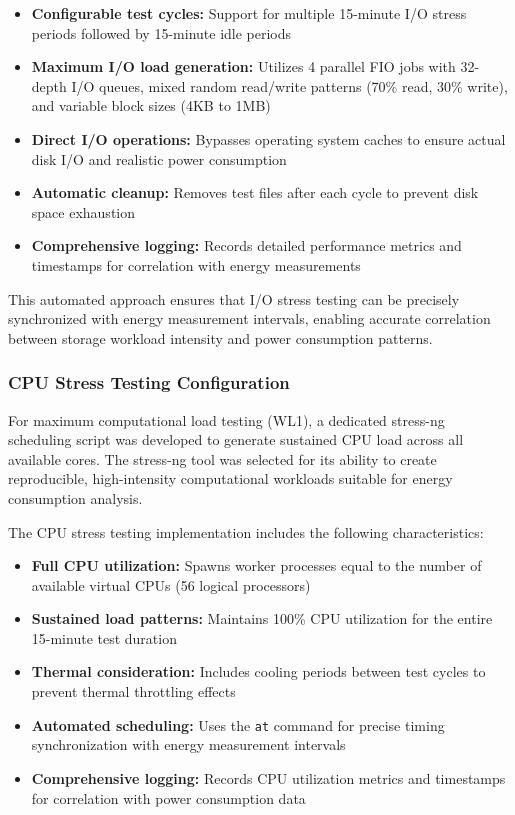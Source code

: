 \begin{itemize}
    \item \textbf{Configurable test cycles:} Support for multiple 15-minute I/O stress periods
    followed by 15-minute idle periods
    \item \textbf{Maximum I/O load generation:} Utilizes 4 parallel FIO jobs with 32-depth I/O queues,
    mixed random read/write patterns (70\% read, 30\% write), and variable block sizes (4KB to 1MB)
    \item \textbf{Direct I/O operations:} Bypasses operating system caches to ensure actual disk I/O
    and realistic power consumption
    \item \textbf{Automatic cleanup:} Removes test files after each cycle to prevent disk space
    exhaustion
    \item \textbf{Comprehensive logging:} Records detailed performance metrics and timestamps
    for correlation with energy measurements
\end{itemize}

This automated approach ensures that I/O stress testing can be precisely 
synchronized with energy measurement intervals, enabling accurate correlation 
between storage workload intensity and power consumption patterns.

\subsubsection{CPU Stress Testing Configuration}
\label{methodology:cpu-stress-testing-configuration}
For maximum computational load testing (WL1), a dedicated stress-ng scheduling 
script was developed to generate sustained CPU load across all available cores. 
The stress-ng tool was selected for its ability to create reproducible, 
high-intensity computational workloads suitable for energy consumption analysis.

The CPU stress testing implementation includes the following characteristics:
\begin{itemize}
    \item \textbf{Full CPU utilization:} Spawns worker processes equal to the 
    number of available virtual CPUs (56 logical processors)
    \item \textbf{Sustained load patterns:} Maintains 100\% CPU utilization 
    for the entire 15-minute test duration
    \item \textbf{Thermal consideration:} Includes cooling periods between test 
    cycles to prevent thermal throttling effects
    \item \textbf{Automated scheduling:} Uses the \texttt{at} command for 
    precise timing synchronization with energy measurement intervals
    \item \textbf{Comprehensive logging:} Records CPU utilization metrics and 
    timestamps for correlation with power consumption data
\end{itemize}

